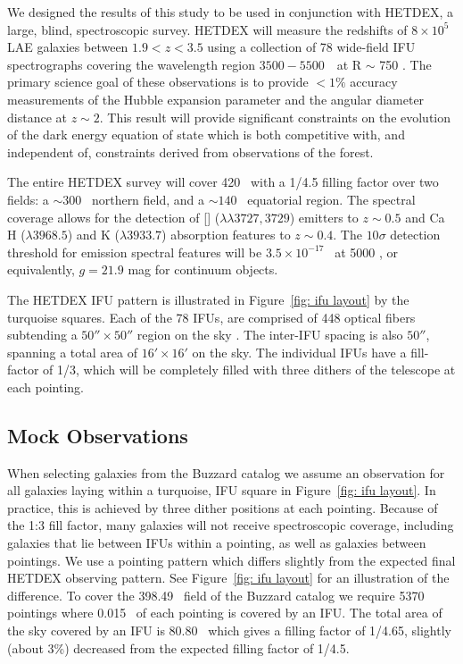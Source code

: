 \documentclass[fleqn,usenatbib]{mnras}
\begin{document}
We designed the results of this study to be used in conjunction with HETDEX, a large, blind, spectroscopic survey. HETDEX will measure the redshifts of $8 \times 10^5$ LAE galaxies between $1.9 < z < 3.5$ using a collection of 78 wide-field IFU spectrographs covering the wavelength region $3500 - 5500$~\AAA\ at R $\sim$ 750 \citep{Hill2008}. The primary science goal of these observations is to provide $<1\%$ accuracy measurements of the Hubble expansion parameter and the angular diameter distance at $z\sim2$. This result will provide significant constraints on the evolution of the dark energy equation of state which is both competitive with, and independent of, constraints derived from observations of the \lya forest.

The entire HETDEX survey will cover 420 \degsq\ with a 1/4.5 filling factor over two fields: a $\sim 300$ \degsq\ northern field, and a $\sim 140$ \degsq\ equatorial region. The spectral coverage allows for the detection of [] ($\lambda\lambda 3727,3729$) emitters to $z\sim 0.5$ and Ca H ($\lambda 3968.5$) and K ($\lambda 3933.7$) absorption features to $z\sim 0.4$. The $10 \sigma$ detection threshold for emission spectral features will be $3.5\times10^{-17}$ \ergscm\ at 5000 \AAA, or equivalently, $g = 21.9$ mag for continuum objects. 

The HETDEX IFU pattern is illustrated in Figure~\ref{fig: ifu layout} by the turquoise squares. Each of the 78 IFUs, are comprised of 448 optical fibers subtending a $50'' \times 50''$ region on the sky \citep{Kelz2014}. The inter-IFU spacing is also $50''$, spanning a total area of $16'\times 16'$ on the sky. The individual IFUs have a fill-factor of 1/3, which will be completely filled with three dithers of the telescope at each pointing.

\subsection{Mock Observations}\label{sec: observations}
When selecting galaxies from the Buzzard catalog we assume an observation for all galaxies laying within a turquoise, IFU square in Figure~\ref{fig: ifu layout}. In practice, this is achieved by three dither positions at each pointing. Because of the 1:3 fill factor, many galaxies will not receive spectroscopic coverage, including galaxies that lie between IFUs within a pointing, as well as galaxies between pointings. We use a pointing pattern which differs slightly from the expected final HETDEX observing pattern. See Figure~\ref{fig: ifu layout} for an illustration of the difference. To cover the 398.49 \degsq\ field of the Buzzard catalog we require 5370 pointings where 0.015 \degsq\ of each pointing is covered by an IFU. The total area of the sky covered by an IFU is 80.80 \degsq\ which gives a filling factor of 1/4.65, slightly (about 3\%) decreased from the expected filling factor of 1/4.5.
\end{document}
